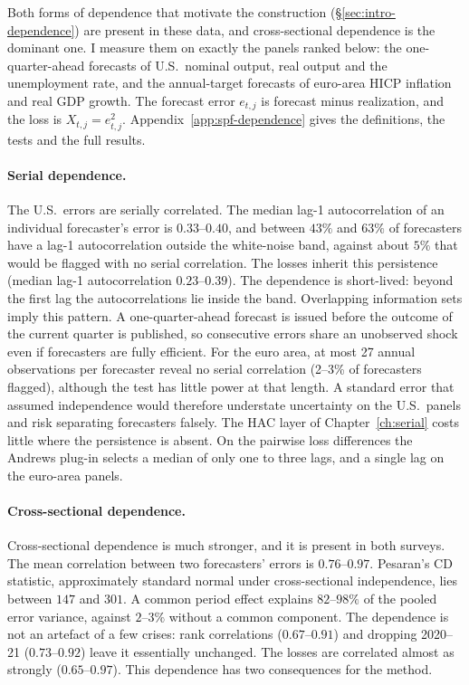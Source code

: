 Both forms of dependence that motivate the construction (\S\ref{sec:intro-dependence})
are present in these data, and cross-sectional dependence is the dominant one. I measure
them on exactly the panels ranked below: the one-quarter-ahead forecasts of U.S.\ nominal
output, real output and the unemployment rate, and the annual-target forecasts of
euro-area HICP inflation and real GDP growth. The forecast error $e_{t,j}$ is forecast
minus realization, and the loss is $X_{t,j}=e_{t,j}^2$. Appendix~\ref{app:spf-dependence}
gives the definitions, the tests and the full results.

\paragraph{Serial dependence.} The U.S.\ errors are serially correlated. The median lag-1
autocorrelation of an individual forecaster's error is $0.33$--$0.40$, and between $43\%$
and $63\%$ of forecasters have a lag-1 autocorrelation outside the white-noise band,
against about $5\%$ that would be flagged with no serial correlation. The losses inherit
this persistence (median lag-1 autocorrelation $0.23$--$0.39$). The dependence is
short-lived: beyond the first lag the autocorrelations lie inside the band. Overlapping
information sets imply this pattern. A one-quarter-ahead forecast is issued before the
outcome of the current quarter is published, so consecutive errors share an unobserved
shock even if forecasters are fully efficient. For the euro area, at most 27 annual
observations per forecaster reveal no serial correlation (2--3\% of forecasters flagged),
although the test has little power at that length. A standard error that assumed
independence would therefore understate uncertainty on the U.S.\ panels and risk
separating forecasters falsely. The HAC layer of Chapter~\ref{ch:serial} costs little
where the persistence is absent. On the pairwise loss differences the Andrews plug-in
selects a median of only one to three lags, and a single lag on the euro-area panels.

\paragraph{Cross-sectional dependence.} Cross-sectional dependence is much stronger, and
it is present in both surveys. The mean correlation between two forecasters' errors is
$0.76$--$0.97$. Pesaran's CD statistic, approximately standard normal under
cross-sectional independence, lies between $147$ and $301$. A common period effect
explains $82$--$98\%$ of the pooled error variance, against $2$--$3\%$ without a common
component. The dependence is not an artefact of a few crises: rank correlations
($0.67$--$0.91$) and dropping 2020--21 ($0.73$--$0.92$) leave it essentially unchanged.
The losses are correlated almost as strongly ($0.65$--$0.97$). This dependence has two
consequences for the method.

